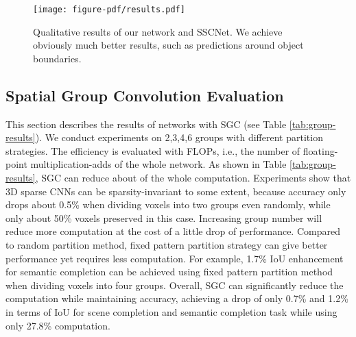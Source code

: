 \documentclass[runningheads]{llncs}
\begin{document}
\begin{figure}
\centering
\texttt{[image: figure-pdf/results.pdf]}
\caption{Qualitative results of our network and SSCNet. We achieve obviously much better results, such as predictions around object boundaries.}
\label{fig:results}
\end{figure}

\subsection{Spatial Group Convolution Evaluation}
This section describes the results of networks with SGC (see Table \ref{tab:group-results}). We conduct experiments on 2,3,4,6 groups with different partition strategies. The efficiency is evaluated with FLOPs, i.e., the number of floating-point multiplication-adds of the whole network. As shown in Table \ref{tab:group-results}, SGC can reduce about  of the whole computation.
Experiments show that 3D sparse CNNs can be sparsity-invariant to some extent, because accuracy only drops about 0.5\% when dividing voxels into two groups even randomly, while only about 50\% voxels preserved in this case. Increasing group number will reduce more computation at the cost of a little drop of performance. Compared to random partition method, fixed pattern partition strategy can give better performance yet requires less computation. For example, 1.7\% IoU enhancement for semantic completion can be achieved using fixed pattern partition method when dividing voxels into four groups.
Overall, SGC can significantly reduce the computation while maintaining accuracy, achieving a drop of only 0.7\% and 1.2\% in terms of IoU for scene completion and semantic completion task while using only 27.8\% computation.
\end{document}
